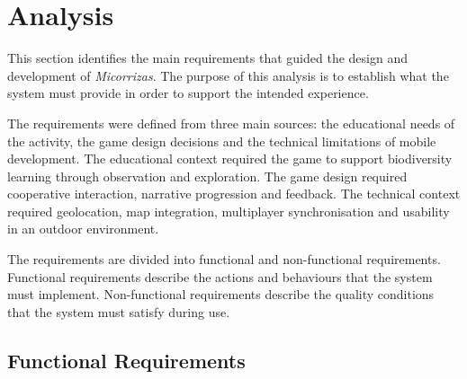 \chapter{Analysis}
This section identifies the main requirements that guided the design and development of \textit{Micorrizas}. The purpose of this analysis is to establish what the system must provide in order to support the intended experience. 

The requirements were defined from three main sources: the educational needs of the activity, the game design decisions and the technical limitations of mobile development. The educational context required the game to support biodiversity learning through observation and exploration. The game design required cooperative interaction, narrative progression and feedback. The technical context required geolocation, map integration, multiplayer synchronisation and usability in an outdoor environment.

The requirements are divided into functional and non-functional requirements. Functional requirements describe the actions and behaviours that the system must implement. Non-functional requirements describe the quality conditions that the system must satisfy during use.

\section{Functional Requirements}

\renewcommand{\arraystretch}{1}



